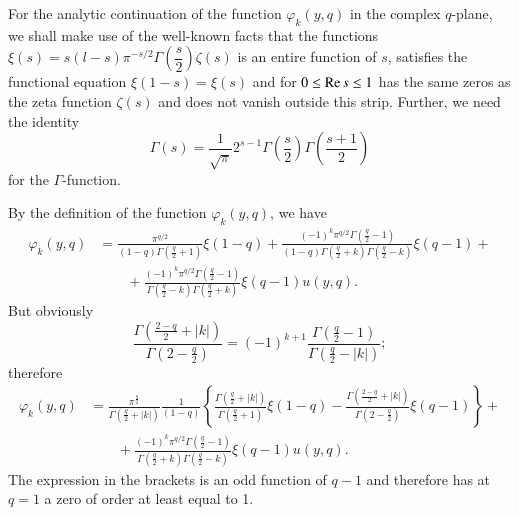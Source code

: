 For the analytic continuation of the function $\varphi_{k}(y,q)$ in
the complex $q$-plane, we shall make use of the well-known facts that
the functions \pageoriginale
$\xi(s)=s(l-s)\pi^{-s/2}\Gamma(\dfrac{s}{2}) \zeta(s)$ is an entire function
of $s$, satisfies the functional equation $\xi(1-s)=\xi(s)$ and for
$0\leq \operatorname{Re} s\leq 1$ has the same zeros as the zeta function $\zeta(s)$
and does not vanish outside this strip. Further, we need the identity
$$
\Gamma(s) = \frac{1}{\surd\pi} 2^{s-1} \Gamma(\frac{s}{2})
\Gamma(\frac{s+1}{2}) 
$$
for the $\Gamma$-function.

By the definition of the function $\varphi_k(y,q)$, we have
\begin{align*}
\varphi_k(y,q) & = \frac{\pi^{q/2}}{(1-q)\Gamma(\frac{q}{2}+1)}
\xi(1-q) + \frac{(-1)^k
  \pi^{q/2}\Gamma(\frac{q}{2}-1)}{(1-q)\Gamma(\frac{q}{2}+k)
  \Gamma(\frac{q}{2}-k)} \xi(q-1) +\\
& \qquad +\frac{(-1)^k \pi^{q/2}
  \Gamma(\frac{q}{2}-1)}{\Gamma(\frac{q}{2}-k) \Gamma(\frac{q}{2}+k)}
\xi (q-1) u(y,q).
\end{align*}
But obviously
$$
\frac{\Gamma(\frac{2-q}{2}+|k|)}{\Gamma(2-\frac{q}{2})} = (-1)^{k+1}
\frac{\Gamma(\frac{q}{2}-1)}{\Gamma(\frac{q}{2}-|k|)}; 
$$
therefore
{\fontsize{10}{12}\selectfont
\begin{align*}
\varphi_k(y,q) & = \frac{\pi^{\frac{q}{2}}}{\Gamma(\frac{q}{2}+|k|)}
\frac{1}{(1-q)}
\left\{\frac{\Gamma(\frac{q}{2}+|k|)}{\Gamma(\frac{q}{2}+1)} \xi (1-q)
-\frac{\Gamma(\frac{2-q}{2}+|k|)}{\Gamma(2-\frac{q}{2})}
\xi(q-1)\right\} +\\
& \qquad + \frac{(-1)^k \pi^{q/2}
  \Gamma(\frac{q}{2}-1)}{\Gamma(\frac{q}{2}+k) \Gamma(\frac{q}{2}-k)}
\xi(q-1)u(y,q).
\end{align*}}\relax
The expression in the brackets is an odd function of $q-1$ and
therefore has at $q=1$ a zero of order at least equal to 1.

